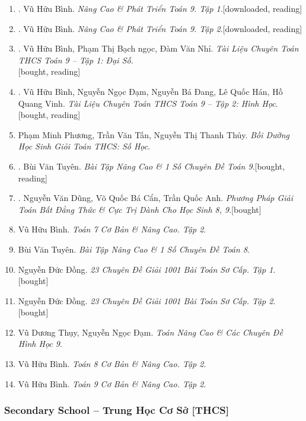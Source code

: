 \documentclass{article}
\begin{document}
\begin{enumerate}
	\item \cite{Binh_Toan_9_tap_1}. Vũ Hữu Bình. \textit{Nâng Cao \& Phát Triển Toán 9. Tập 1}.\hfill\textsf{[downloaded, reading]}
	\item \cite{Binh_Toan_9_tap_2}. Vũ Hữu Bình. \textit{Nâng Cao \& Phát Triển Toán 9. Tập 2}.\hfill\textsf{[downloaded, reading]}
	\item \cite{TLCT_THCS_Toan_9_dai_so}. Vũ Hữu Bình, Phạm Thị Bạch ngọc, Đàm Văn Nhỉ. \textit{Tài Liệu Chuyên Toán THCS Toán 9 -- Tập 1: Đại Số}.\\\mbox{}\hfill\textsf{[bought, reading]}
	\item \cite{TLCT_THCS_Toan_9_hinh_hoc}. Vũ Hữu Bình, Nguyễn Ngọc Đạm, Nguyễn Bá Đang, Lê Quốc Hán, Hồ Quang Vinh. \textit{Tài Liệu Chuyên Toán THCS Toán 9 -- Tập 2: Hình Học}.\hfill\textsf{[bought, reading]}
	\item Phạm Minh Phương, Trần Văn Tấn, Nguyễn Thị Thanh Thủy. \textit{Bồi Dưỡng Học Sinh Giỏi Toán THCS: Số Học}.
	\item \cite{Tuyen_Toan_9}. Bùi Văn Tuyên. \textit{Bài Tập Nâng Cao \& 1 Số Chuyên Đề Toán 9}.\hfill\textsf{[bought, reading]}
	\item \cite{Dung_Can_Anh_BDT_8_9}. Nguyễn Văn Dũng, Võ Quốc Bá Cẩn, Trần Quốc Anh. \textit{Phương Pháp Giải Toán Bất Đẳng Thức \& Cực Trị Dành Cho Học Sinh 8, 9}.\hfill\textsf{[bought]}
	
	\item Vũ Hữu Bình. \textit{Toán 7 Cơ Bản \& Nâng Cao. Tập 2}.
	\item Bùi Văn Tuyên. \textit{Bài Tập Nâng Cao \& 1 Số Chuyên Đề Toán 8}.
	\item Nguyễn Đức Đồng. \textit{23 Chuyên Đề Giải 1001 Bài Toán Sơ Cấp. Tập 1}.\hfill\textsf{[bought]}
	\item Nguyễn Đức Đồng. \textit{23 Chuyên Đề Giải 1001 Bài Toán Sơ Cấp. Tập 2}.\hfill\textsf{[bought]}
	\item Vũ Dương Thụy, Nguyễn Ngọc Đạm. \textit{Toán Nâng Cao \& Các Chuyên Đề Hình Học 9}.
	\item Vũ Hữu Bình. \textit{Toán 8 Cơ Bản \& Nâng Cao. Tập 2}.
	\item Vũ Hữu Bình. \textit{Toán 9 Cơ Bản \& Nâng Cao. Tập 2}.
\end{enumerate}

\subsubsection{Secondary School -- Trung Học Cơ Sở [THCS]}
\end{document}

